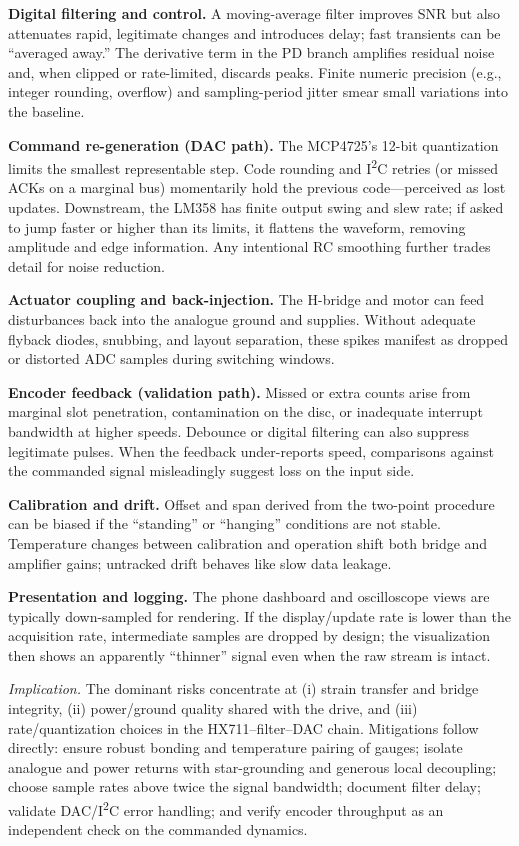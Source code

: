 \textbf{Digital filtering and control.} A moving-average filter improves SNR but also attenuates rapid, legitimate changes and introduces delay; fast transients can be “averaged away.” The derivative term in the PD branch amplifies residual noise and, when clipped or rate-limited, discards peaks. Finite numeric precision (e.g., integer rounding, overflow) and sampling-period jitter smear small variations into the baseline.

\textbf{Command re-generation (DAC path).} The MCP4725’s 12-bit quantization limits the smallest representable step. Code rounding and I\textsuperscript{2}C retries (or missed ACKs on a marginal bus) momentarily hold the previous code—perceived as lost updates. Downstream, the LM358 has finite output swing and slew rate; if asked to jump faster or higher than its limits, it flattens the waveform, removing amplitude and edge information. Any intentional RC smoothing further trades detail for noise reduction.

\textbf{Actuator coupling and back-injection.} The H-bridge and motor can feed disturbances back into the analogue ground and supplies. Without adequate flyback diodes, snubbing, and layout separation, these spikes manifest as dropped or distorted ADC samples during switching windows.

\textbf{Encoder feedback (validation path).} Missed or extra counts arise from marginal slot penetration, contamination on the disc, or inadequate interrupt bandwidth at higher speeds. Debounce or digital filtering can also suppress legitimate pulses. When the feedback under-reports speed, comparisons against the commanded signal misleadingly suggest loss on the input side.

\textbf{Calibration and drift.} Offset and span derived from the two-point procedure can be biased if the “standing” or “hanging” conditions are not stable. Temperature changes between calibration and operation shift both bridge and amplifier gains; untracked drift behaves like slow data leakage.

\textbf{Presentation and logging.} The phone dashboard and oscilloscope views are typically down-sampled for rendering. If the display/update rate is lower than the acquisition rate, intermediate samples are dropped by design; the visualization then shows an apparently “thinner” signal even when the raw stream is intact.

\textit{Implication.} The dominant risks concentrate at (i) strain transfer and bridge integrity, (ii) power/ground quality shared with the drive, and (iii) rate/quantization choices in the HX711–filter–DAC chain. Mitigations follow directly: ensure robust bonding and temperature pairing of gauges; isolate analogue and power returns with star-grounding and generous local decoupling; choose sample rates above twice the signal bandwidth; document filter delay; validate DAC/I\textsuperscript{2}C error handling; and verify encoder throughput as an independent check on the commanded dynamics.
